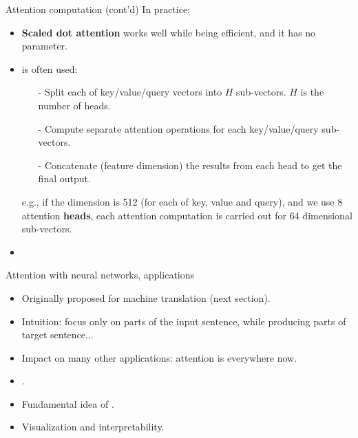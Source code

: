 \begin{frame}{Attention computation (cont'd)}
In practice:
\begin{itemize}
\item \textbf{Scaled dot attention} works well while being efficient, and it has no parameter.
\item {} is often used:
\begin{itemize}
\item[-] Split each of key/value/query vectors into $H$ sub-vectors. $H$ is the number of heads.
\item[-] Compute separate attention operations for each key/value/query sub-vectors.
\item[-] Concatenate (feature dimension) the results from each head to get the final output.
\end{itemize}
e.g., if the dimension is 512 (for each of key, value and query), and we use 8 attention \textbf{heads}, each attention computation is carried out for 64 dimensional sub-vectors.
\item {}
\end{itemize}
\end{frame}



\begin{frame}{Attention with neural networks, applications}
\begin{itemize}
\item Originally proposed for machine translation (next section).
\item Intuition: focus only on parts of the input sentence, while producing parts of target sentence...
\item Impact on many other applications: attention is everywhere now.
\item {}.
\item Fundamental idea of .
\item Visualization and interpretability.
\end{itemize}
\end{frame}



